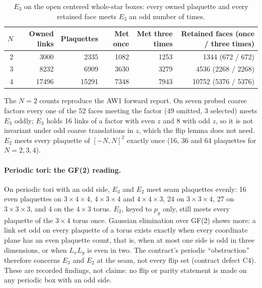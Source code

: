 \begin{table}[htbp]
\centering\small
\caption{$E_3$ on the open centered whole-star boxes: every owned plaquette
and every retained face meets $E_3$ an odd number of times.}
\label{tab:bd1-flipsets}
\begin{tabular}{rrrrrr}
\toprule
$N$ & Owned links & Plaquettes & Met once & Met three times & Retained faces (once / three times)\\
\midrule
2 & 3000 & 2335 & 1082 & 1253 & 1344 (672 / 672)\\
3 & 8232 & 6909 & 3630 & 3279 & 4536 (2268 / 2268)\\
4 & 17496 & 15291 & 7348 & 7943 & 10752 (5376 / 5376)\\
\bottomrule
\end{tabular}
\end{table}

The $N=2$ counts reproduce the AW1 forward report. On seven probed coarse
factors every one of the 52 faces meeting the factor (49 omitted, 3
selected) meets $E_3$ oddly; $E_3$ holds 16 links of a factor with even $z$
and 8 with odd $z$, so it is not invariant under odd coarse translations in
$z$, which the flip lemma does not need. $E_2$ meets every plaquette of
$[-N,N]^2$ exactly once (16, 36 and 64 plaquettes for $N=2,3,4$).

\paragraph{Periodic tori: the GF(2) reading.} On periodic tori with an odd
side, $E_3$ and $E_2$ meet seam plaquettes evenly: 16 even plaquettes on
$3\times4\times4$, $4\times3\times4$ and $4\times4\times3$, 24 on
$3\times3\times4$, 27 on $3\times3\times3$, and 4 on the $4\times3$ torus. $E_2$,
keyed to $p_y$ only, still meets every plaquette of the $3\times4$ torus once.
Gaussian elimination over GF(2) shows more: a link set odd on every plaquette
of a torus exists exactly when every coordinate plane has an even plaquette
count, that is, when at most one side is odd in three dimensions, or when
$L_xL_y$ is even in two. The contract's periodic ``obstruction'' therefore
concerns $E_3$ and $E_2$ at the seam, not every flip set (contract defect
C4). These are recorded findings, not claims: no flip or parity statement is
made on any periodic box with an odd side.

